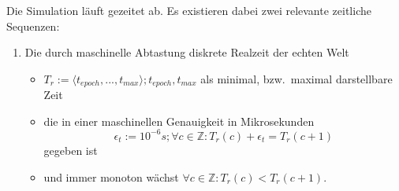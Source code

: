 Die Simulation läuft gezeitet ab. Es existieren dabei zwei relevante zeitliche Sequenzen:
\begin{enumerate}
\item Die durch maschinelle Abtastung diskrete Realzeit der echten Welt\\
	\begin{itemize}
	\item $T_r:=\langle t_{epoch}, ... , t_{max}\rangle ; t_{epoch}, t_{max}$ als minimal, bzw.~maximal darstellbare Zeit
	\item die in einer maschinellen Genauigkeit in Mikrosekunden $$\epsilon_t:=10^{-6}s ; \forall c \in \mathbb{Z}: T_r(c) + \epsilon_t = T_r(c+1)$$ gegeben ist
	\item und immer monoton wächst $\forall c \in \mathbb{Z}: T_r(c) < T_r(c+1)$. 
	\end{itemize}


\end{enumerate}

